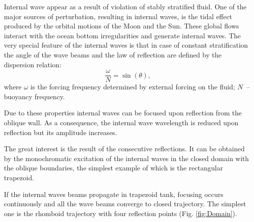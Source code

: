 \documentclass[a4wide,fontsize=12pt]{article}
\begin{document}
Internal wave appear as a result of violation of stably stratified fluid. 
One of the major sources of perturbation, resulting in internal waves, is the tidal effect produced by the orbital motions of the Moon and the Sun. These global flows interact with the ocean bottom irregularities and generate internal waves. The very special feature of the internal waves is that in case of constant stratification the angle of the wave beams and the law of reflection are defined by the dispersion relation:
$$\frac{\omega}{N} = \sin(\theta),$$
where $\omega$ is the forcing frequency determined by external forcing on the fluid; 
$N$~-- buoyancy frequency.


Due to these properties internal waves can be focused upon reflection from the oblique wall. As a consequence,  the internal wave wavelength is reduced upon reflection but its amplitude increases.


The great interest is the result of the consecutive reflections. It can be obtained by the monochromatic excitation of the internal waves in the closed domain with the oblique boundaries, the simplest example of which is the rectangular trapezoid.

If the internal waves beams propagate in trapezoid tank, focusing occurs continuously and all the wave beams converge to closed trajectory. The simplest one is the rhomboid trajectory with four reflection points (Fig. \ref{fig:Domain}).
\end{document}
